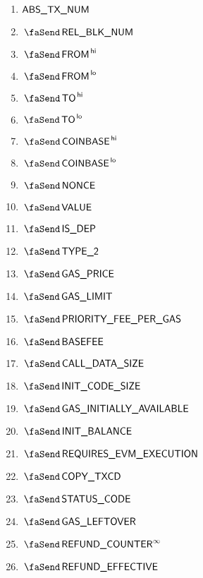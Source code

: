\begin{description}
\begin{multicols}{3}
			\begin{enumerate}
				\item $\textsf{ABS\_TX\_NUM}$
				\item $\txBlockNum$
				\item $\txFrom\high$
				\item $\txFrom\low$
				\item $\txTo\high$
				\item $\txTo\low$
				\item $\txCoinbase\high$
				\item $\txCoinbase\low$
				\item $\txNonce$
				\item $\txValue$
				\item $\txIsDeployment$
				\item $\txIsTypeTwo$
				\item $\txGasPrice$
				\item $\txGasLimit$
				\item $\txPriorityFeePerGas$
				\item $\txBasefee$
				\item $\txCallDataSize$
				\item $\txInitCodeSize$
				\item $\txInitialGas$
				\item $\txInitialBalance$
				\item $\txRequiresEvmExecution$
				\item $\txCopyTxcd$ 
				\item $\txStatusCode$
				\item $\txLeftoverGas$
				\item $\txFinalRefundCounter$
				\item $\txEffectiveRefund$
			\end{enumerate}
		\end{multicols}
\end{description}
